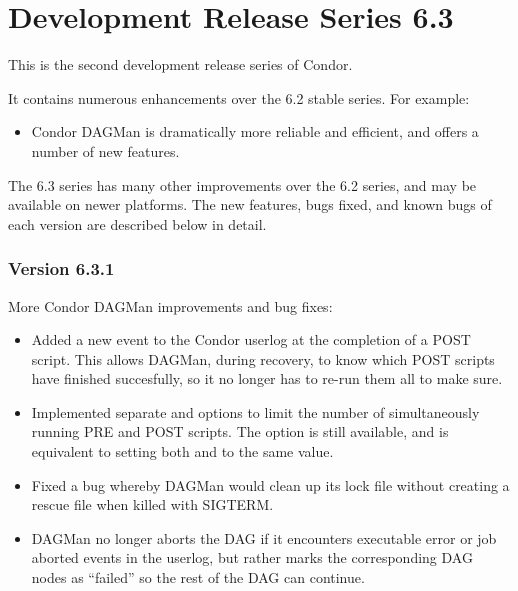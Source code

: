 \section{\label{sec:History-6-3}Development Release Series 6.3}

This is the second development release series of Condor.

It contains numerous enhancements over the 6.2 stable series.
For example:

\begin{itemize}

\item 
Condor DAGMan is dramatically more reliable and efficient, and offers
a number of new features.

\end{itemize}

The 6.3 series has many other improvements over the 6.2 series, and
may be available on newer platforms.  The new features, bugs fixed,
and known bugs of each version are described below in detail.


\subsubsection{\label{sec:New-6-3-1}Version 6.3.1}

\noindent
More Condor DAGMan improvements and bug fixes:

\begin{itemize}

\item
Added a new event to the Condor userlog at the completion of a POST
script.  This allows DAGMan, during recovery, to know which POST
scripts have finished succesfully, so it no longer has to re-run them
all to make sure.

\item
Implemented separate  and  options to limit
the number of simultaneously running PRE and POST scripts.  The
 option is still available, and is equivalent to
setting both  and  to the same value.

\item
Fixed a bug whereby DAGMan would clean up its lock file without
creating a rescue file when killed with SIGTERM.

\item
DAGMan no longer aborts the DAG if it encounters executable error or
job aborted events in the userlog, but rather marks the corresponding
DAG nodes as ``failed'' so the rest of the DAG can continue.

\end{itemize}


